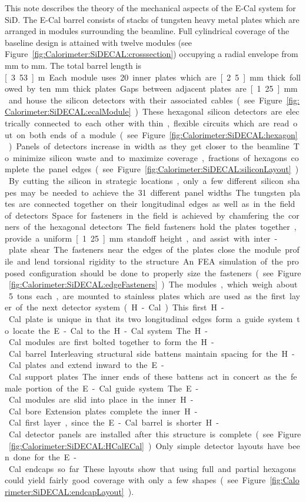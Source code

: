 This note describes the theory of the mechanical aspects of the E-Cal system for
SiD. The E-Cal barrel consists of stacks of tungsten heavy metal plates which
are arranged in modules surrounding the beamline. Full cylindrical coverage of
the baseline design is attained with twelve modules (see Figure~\ref{fig:Calorimeter:SiDECAL:crosssection}) occupying a
radial envelope from \unit[1265]{mm} to \unit[1409]{mm}. The total barrel length is \unit[3.53]{m}. Each
module uses 20 inner plates which are \unit[2.5]{mm} thick followed by ten \unit[5]{mm} thick
plates. Gaps between adjacent plates are \unit[1.25]{mm} and house the silicon detectors
with their associated cables (see Figure~\ref{fig:Calorimeter:SiDECAL:ecalModule}). These hexagonal silicon detectors
are electrically connected to each other with thin, flexible circuits which are
read out on both ends of a module (see Figure~\ref{fig:Calorimeter:SiDECAL:hexagon}). Panels of detectors increase
in width as they get closer to the beamline. To minimize silicon waste and to
maximize coverage, fractions of hexagons complete the panel edges (see Figure~\ref{fig:Calorimeter:SiDECAL:siliconLayout}). By cutting the silicon in strategic locations, only a few different silicon
shapes may be needed to achieve the 31 different panel widths. The tungsten
plates are connected together on their longitudinal edges as well as in the
field of detectors. Space for fasteners in the field is achieved by chamfering
the corners of the hexagonal detectors. The field fasteners hold the plates
together, provide a uniform \unit[1.25]{mm} standoff height, and assist with inter-plate
shear. The fasteners near the edges of the plates close the module profile and
lend torsional rigidity to the structure. An FEA simulation of the proposed
configuration should be done to properly size the fasteners (see Figure~\ref{fig:Calorimeter:SiDECAL:edgeFasteners}).The
modules, which weigh about 5 tons each, are mounted to stainless plates which
are used as the first layer of the next detector system (H-Cal). This first
H-Cal plate is unique in that its two longitudinal edges form a guide system to
locate the E-Cal to the H-Cal system. The H-Cal modules are first bolted
together to form the H-Cal barrel. Interleaving structural side battens maintain
spacing for the H-Cal plates and extend inward to the E-Cal support plates. The
inner ends of these battens act in concert as the female portion of the E-Cal
guide system. The E-Cal modules are slid into place in the inner H-Cal bore.
Extension plates complete the inner H-Cal first layer, since the E-Cal barrel is
shorter. H-Cal detector panels are installed after this structure is complete
(see Figure~\ref{fig:Calorimeter:SiDECAL:HCalECal}). Only simple detector layouts have been done for the E-Cal
endcaps so far. These layouts show that using full and partial hexagons could
yield fairly good coverage with only a few shapes. (see Figure~\ref{fig:Calorimeter:SiDECAL:endcapLayout}).

